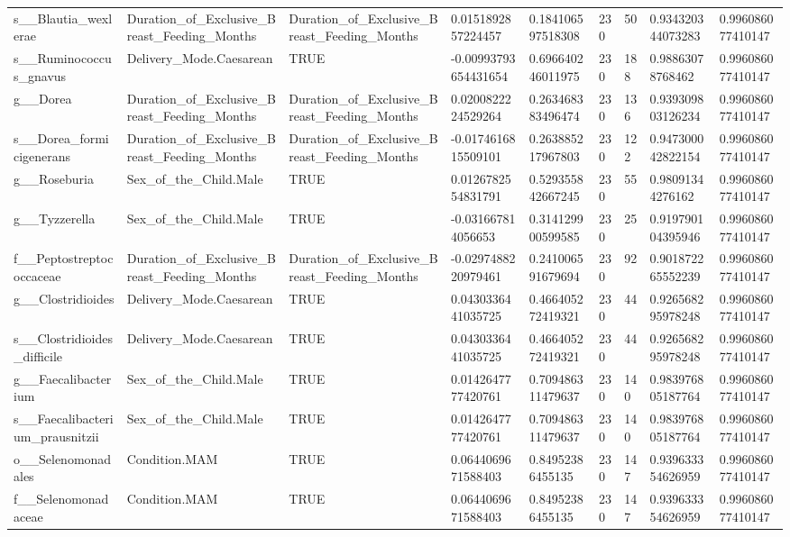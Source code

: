 \begin{longtable}{lllllllll}
s\_\_Blautia\_wexlerae & Duration\_of\_Exclusive\_Breast\_Feeding\_Months & Duration\_of\_Exclusive\_Breast\_Feeding\_Months & 0.0151892857224457 & 0.184106597518308 & 230 & 50 & 0.934320344073283 & 0.996086077410147 \\
s\_\_Ruminococcus\_gnavus & Delivery\_Mode.Caesarean & TRUE & -0.00993793654431654 & 0.696640246011975 & 230 & 188 & 0.98863078768462 & 0.996086077410147 \\
g\_\_Dorea & Duration\_of\_Exclusive\_Breast\_Feeding\_Months & Duration\_of\_Exclusive\_Breast\_Feeding\_Months & 0.0200822224529264 & 0.263468383496474 & 230 & 136 & 0.939309803126234 & 0.996086077410147 \\
s\_\_Dorea\_formicigenerans & Duration\_of\_Exclusive\_Breast\_Feeding\_Months & Duration\_of\_Exclusive\_Breast\_Feeding\_Months & -0.0174616815509101 & 0.263885217967803 & 230 & 122 & 0.947300042822154 & 0.996086077410147 \\
g\_\_Roseburia & Sex\_of\_the\_Child.Male & TRUE & 0.0126782554831791 & 0.529355842667245 & 230 & 55 & 0.98091344276162 & 0.996086077410147 \\
g\_\_Tyzzerella & Sex\_of\_the\_Child.Male & TRUE & -0.031667814056653 & 0.314129900599585 & 230 & 25 & 0.919790104395946 & 0.996086077410147 \\
f\_\_Peptostreptococcaceae & Duration\_of\_Exclusive\_Breast\_Feeding\_Months & Duration\_of\_Exclusive\_Breast\_Feeding\_Months & -0.0297488220979461 & 0.241006591679694 & 230 & 92 & 0.901872265552239 & 0.996086077410147 \\
g\_\_Clostridioides & Delivery\_Mode.Caesarean & TRUE & 0.0430336441035725 & 0.466405272419321 & 230 & 44 & 0.926568295978248 & 0.996086077410147 \\
s\_\_Clostridioides\_difficile & Delivery\_Mode.Caesarean & TRUE & 0.0430336441035725 & 0.466405272419321 & 230 & 44 & 0.926568295978248 & 0.996086077410147 \\
g\_\_Faecalibacterium & Sex\_of\_the\_Child.Male & TRUE & 0.0142647777420761 & 0.709486311479637 & 230 & 140 & 0.983976805187764 & 0.996086077410147 \\
s\_\_Faecalibacterium\_prausnitzii & Sex\_of\_the\_Child.Male & TRUE & 0.0142647777420761 & 0.709486311479637 & 230 & 140 & 0.983976805187764 & 0.996086077410147 \\
o\_\_Selenomonadales & Condition.MAM & TRUE & 0.0644069671588403 & 0.84952386455135 & 230 & 147 & 0.939633354626959 & 0.996086077410147 \\
f\_\_Selenomonadaceae & Condition.MAM & TRUE & 0.0644069671588403 & 0.84952386455135 & 230 & 147 & 0.939633354626959 & 0.996086077410147 \\

\end{longtable}

